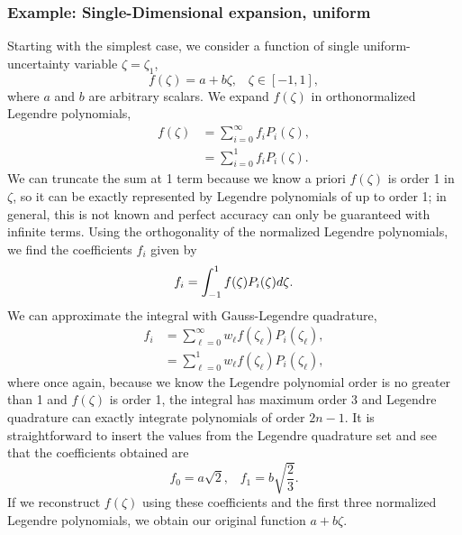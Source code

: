 \subsubsection{Example: Single-Dimensional expansion, uniform}
Starting with the simplest case, we consider a function of single uniform-uncertainty variable $\zeta=\zeta_1$,
\begin{equation}
f(\zeta)=a+b\zeta, \hspace{10pt}\zeta\in[-1,1],
\end{equation}
where $a$ and $b$ are arbitrary scalars.  We expand $f(\zeta)$ in orthonormalized Legendre polynomials,
\begin{align}
f(\zeta)&=\sum_{i=0}^\infty f_i P_i(\zeta),\\
 &= \sum_{i=0}^1 f_i P_i(\zeta).
\end{align}
We can truncate the sum at 1 term because we know a priori $f(\zeta)$ is order 1 in $\zeta$, so it can be exactly represented by Legendre polynomials of up to order 1; in general, this is not known and perfect accuracy can only be guaranteed with infinite terms.  Using the orthogonality of the normalized Legendre polynomials, we find the coefficients $f_i$ given by
\begin{equation}
f_i=\int_{-1}^1 f(\zeta)P_i(\zeta)d\zeta.
\end{equation}
We can approximate the integral with Gauss-Legendre quadrature,
\begin{align}
f_i&=\sum_{\ell=0}^\infty w_\ell f(\zeta_\ell) P_i(\zeta_\ell),\\
 &=\sum_{\ell=0}^1 w_\ell f(\zeta_\ell) P_i(\zeta_\ell),
\end{align}
where once again, because we know the Legendre polynomial order is no greater than 1 and $f(\zeta)$ is order 1, the integral has maximum order 3 and Legendre quadrature can exactly integrate polynomials of order $2n-1$.  It is straightforward to insert the values from the Legendre quadrature set and see that the coefficients obtained are
\begin{equation}
f_0=a\sqrt{2},\hspace{10pt} f_1=b\sqrt{\frac{2}{3}}.
\end{equation}
If we reconstruct $f(\zeta)$ using these coefficients and the first three normalized Legendre polynomials, we obtain our original function $a+b\zeta$.


